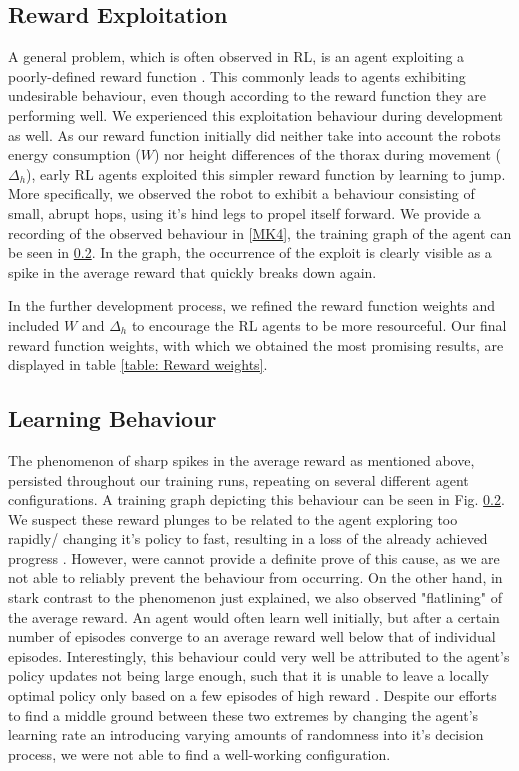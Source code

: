 \subsection{Reward Exploitation}
A general problem, which is often observed in RL, is an agent exploiting a poorly-defined reward function \parencite{silver2015}.
This commonly leads to agents exhibiting undesirable behaviour, even though according to the reward function they are performing well.
We experienced this exploitation behaviour during development as well.
As our reward function initially did neither take into account the robots energy consumption ($W$) nor height differences of the thorax during movement ($ \Delta_h$), early RL agents exploited this simpler reward function by learning to jump.
More specifically, we observed the robot to exhibit a behaviour consisting of small, abrupt hops, using it's hind legs to propel itself forward.
We provide a recording of the observed behaviour in [\hyperref[vid: MK4]{MK4}], the training graph of the agent can be seen in \ref{}.
In the graph, the occurrence of the exploit is clearly visible as a spike in the average reward that quickly breaks down again.

In the further development process, we refined the reward function weights and included $W$ and $\Delta_h$ to encourage the RL agents to be more resourceful. 
Our final reward function weights, with which we obtained the most promising results, are displayed in table \ref{table: Reward weights}.


\subsection{Learning Behaviour}
The phenomenon of sharp spikes in the average reward as mentioned above, persisted throughout our training runs, repeating on several different agent configurations.
A training graph depicting this behaviour can be seen in Fig. \ref{}.
We suspect these reward plunges to be related to the agent exploring too rapidly/ changing it's policy to fast, resulting in a loss of the already achieved progress \parencite{silver2015}.
However, were cannot provide a definite prove of this cause, as we are not able to reliably prevent the behaviour from occurring.
On the other hand, in stark contrast to the phenomenon just explained, we also observed "flatlining" of the average reward.
An agent would often learn well initially, but after a certain number of episodes converge to an average reward well below that of individual episodes.
Interestingly, this behaviour could very well be attributed to the agent's policy updates not being large enough, such that it is unable to leave a locally optimal policy only based on a few episodes of high reward \parencite{silver2015}.
Despite our efforts to find a middle ground between these two extremes by changing the agent's learning rate an introducing varying amounts of randomness into it's decision process, we were not able to find a well-working configuration.


